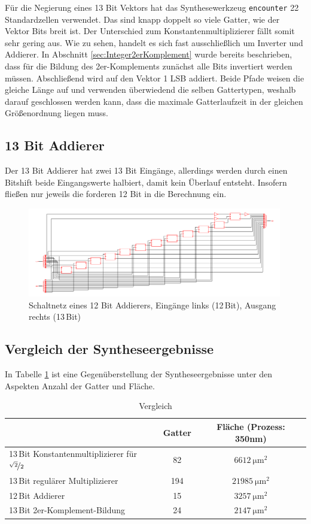 Für die Negierung eines 13 Bit Vektors hat das Synthesewerkzeug \texttt{encounter} 22 Standardzellen verwendet. Das sind knapp doppelt so viele Gatter, wie der Vektor 
Bits breit ist. Der Unterschied zum Konstantenmultiplizierer fällt somit sehr gering aus. 
Wie zu sehen, handelt es sich fast ausschließlich um Inverter und Addierer. In Abschnitt \ref{sec:Integer2erKomplement} wurde bereits beschrieben, dass für die Bildung des
2er-Komplements zunächst alle Bits invertiert werden müssen. Abschließend wird auf den Vektor 1 LSB addiert. 
Beide Pfade weisen die gleiche Länge auf und verwenden überwiedend die selben
Gattertypen, weshalb darauf geschlossen werden kann, dass die maximale Gatterlaufzeit in der gleichen Größenordnung liegen muss.

\subsection{13 Bit Addierer}
Der 13 Bit Addierer hat zwei 13 Bit Eingänge, allerdings werden durch einen Bitshift beide Eingangswerte halbiert, damit kein Überlauf entsteht. Insofern fließen nur jeweils 
die forderen 12 Bit in die Berechnung ein.
\begin{figure}[htbp]
 \centering
 \includegraphics[width=0.99\textwidth]{img/13Bit_Addierer.png}
 \caption{Schaltnetz eines 12 Bit Addierers, Eingänge links (12\,Bit), Ausgang rechts (13\,Bit)}
 \label{pic:13BitAddierer}
\end{figure}

\subsection{Vergleich der Syntheseergebnisse}
 In Tabelle \ref{tab:VergleichSyntheseergebnisse} ist eine Gegenüberstellung der Syntheseergebnisse unter den Aspekten Anzahl der Gatter und Fläche.
\begin{table}[!ht]
\centering
 \caption{Vergleich}
 \label{tab:VergleichSyntheseergebnisse}
 \begin{tabular}{lcc}
 \hline
				&Gatter  	&Fläche (Prozess: 350nm) \\
  \hline	
  13\,Bit Konstantenmultiplizierer für $\nicefrac{\sqrt{2}}{2}$	& 82		& $\SI{6612}{\um^2}$ \\
  13\,Bit regulärer Multiplizierer				& 194		& $\SI{21985}{\um^2}$\\
  12\,Bit Addierer						& 15		& $\SI{3257}{\um^2}$\\
  13\,Bit 2er-Komplement-Bildung				& 24		& $\SI{2147}{\um^2}$\\
  \hline
 \end{tabular}
\end{table}



